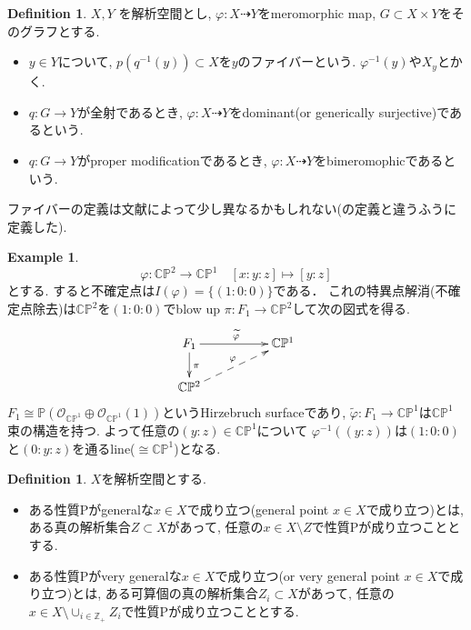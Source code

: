 \documentclass[dvipdfmx,a4paper,11pt]{article} %
\theoremstyle{definition}
\newtheorem{defn}[thm]{Definition}
\newtheorem{ex}[thm]{Example}
\theoremstyle{remark}
\numberwithin{equation}{section}
\newcommand{\N}{\mathbb{Z}_+}
\newcommand{\C}{\mathbb{C}}
\begin{document}
\begin{defn}\cite[Definition 2.6, 2.7]{Uen75}
\label{defn-Ueno-2.2}
\(X, Y\) を解析空間とし, $\varphi : X \dashrightarrow Y$をmeromorphic map, $G \subset X \times Y$をそのグラフとする. 
\begin{itemize}
\item $y \in Y$について, $p(q^{-1}(y)) \subset X$を$y$のファイバーという. $\varphi^{-1}(y)$や$X_y$とかく. 
\item $q : G \to Y$が全射であるとき, $\varphi : X \dashrightarrow Y$をdominant(or generically surjective)であるという. 
\item $q : G \to Y$がproper modificationであるとき, $\varphi : X \dashrightarrow Y$をbimeromophicであるという. 
\end{itemize}
\end{defn}
ファイバーの定義は文献によって少し異なるかもしれない(\cite{Cam04}の定義と違うふうに定義した).

\begin{ex}
\label{ex-projection}
$$
\varphi : \C\mathbb{P}^2 \to \C\mathbb{P}^1 
\quad
[x:y:z] \mapsto [y:z] 
$$
とする. すると不確定点は$I(\varphi)=\{(1:0:0) \}$である．
これの特異点解消(不確定点除去)は$ \C\mathbb{P}^2$を$(1:0:0)$でblow up
$\pi : F_1 \to \C\mathbb{P}^2 $して次の図式を得る. 
   \[
\xymatrix@C=50pt@R=20pt{
F_1 \ar@{->}[r]^{\widetilde{\varphi}}\ar@{->}[d]^{\pi} &\C\mathbb{P}^1\\
\C\mathbb{P}^2 \ar@{-->}[ru]^{\varphi}  & \\
}
\]
$F_1 \cong \mathbb{P}(\mathcal{O}_{\C\mathbb{P}^1}\oplus \mathcal{O}_{\C\mathbb{P}^1}(1))$というHirzebruch surfaceであり, $\widetilde{\varphi} : F_1 \to \C\mathbb{P}^1$は$\C\mathbb{P}^1$束の構造を持つ. よって任意の$(y:z) \in \C\mathbb{P}^1$について
$\varphi^{-1}((y:z))$は$(1:0:0)$と$(0 : y : z)$を通るline($\cong \C\mathbb{P}^1$)となる. 
\end{ex}


\begin{defn}
$X$を解析空間とする.
 
 \begin{itemize}
\item ある性質Pがgeneralな$x \in X$で成り立つ(general point $x \in X$で成り立つ)とは, ある真の解析集合$Z \subset X$があって, 任意の$x \in X \setminus Z$で性質Pが成り立つこととする. 
\item ある性質Pがvery generalな$x \in X$で成り立つ(or very general point $x \in X$で成り立つ)とは, ある可算個の真の解析集合$Z_i \subset X$があって, 任意の$x \in X \setminus \cup_{i \in \N} Z_i$で性質Pが成り立つこととする.
\end{itemize} 
\end{defn}
\end{document}
